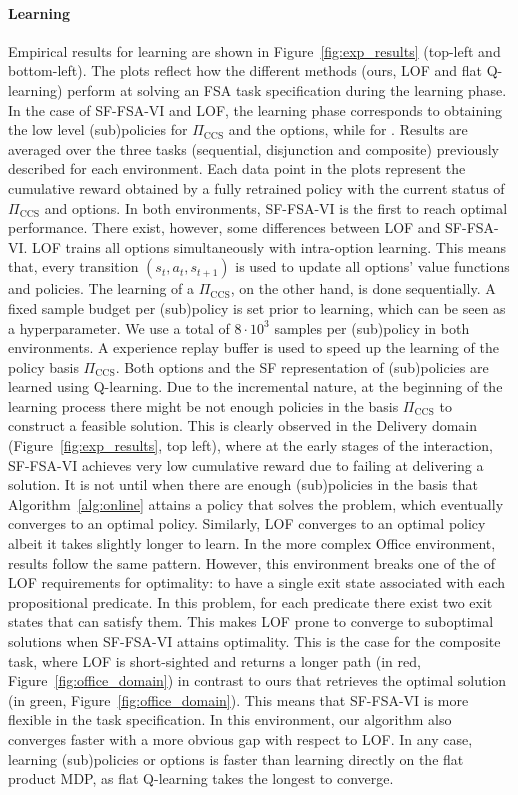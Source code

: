 \paragraph{Learning} Empirical results for learning are shown in Figure~\ref{fig:exp_results} (top-left and bottom-left). The plots reflect how the different methods (ours, LOF and flat Q-learning) perform at solving an FSA task specification during the learning phase. In the case of SF-FSA-VI and LOF, the learning phase corresponds to obtaining the low level (sub)policies for $\Pi_\text{CCS}$ and the options, while for . Results are averaged over the three tasks (sequential, disjunction and composite) previously described for each environment. Each data point in the plots represent the cumulative reward obtained by a fully retrained policy with the current status of $\Pi_\text{CCS}$ and options. In both environments, SF-FSA-VI is the first to reach optimal performance. There exist, however, some differences between LOF and SF-FSA-VI. LOF trains all options simultaneously with intra-option learning. This means that, every transition $(s_t, a_t, s_{t+1})$ is used to update all options' value functions and policies. The learning of a $\Pi_\text{CCS}$, on the other hand, is done sequentially. A fixed sample budget per (sub)policy is set prior to learning, which can be seen as a hyperparameter. We use a total of $8\cdot 10^3$ samples per (sub)policy in both environments. A experience replay buffer is used to speed up the learning of the policy basis $\Pi_\text{CCS}$. Both options and the SF representation of (sub)policies are learned using Q-learning. Due to the incremental nature, at the beginning of the learning process there might be not enough policies in the basis $\Pi_\text{CCS}$ to construct a feasible solution. This is clearly observed in the Delivery domain (Figure~\ref{fig:exp_results}, top left), where at the early stages of the interaction, SF-FSA-VI achieves very low cumulative reward due to failing at delivering a solution. It is not until when there are enough (sub)policies in the basis that Algorithm~\ref{alg:online} attains a policy that solves the problem, which eventually converges to an optimal policy. Similarly, LOF converges to an optimal policy albeit it takes slightly longer to learn. In the more complex Office environment, results follow the same pattern. However, this environment breaks one of the of LOF requirements for optimality: to have a single exit state associated with each propositional predicate. In this problem, for each predicate there exist two exit states that can satisfy them. This makes LOF prone to converge to suboptimal solutions when SF-FSA-VI attains optimality. This is the case for the composite task, where LOF is short-sighted and returns a longer path (in red, Figure~\ref{fig:office_domain}) in contrast to ours that retrieves the optimal solution (in green, Figure~\ref{fig:office_domain}). This means that SF-FSA-VI is more flexible in the task specification. In this environment, our algorithm also converges faster with a more obvious gap with respect to LOF. In any case, learning (sub)policies or options is faster than learning directly on the flat product MDP, as flat Q-learning takes the longest to converge.


